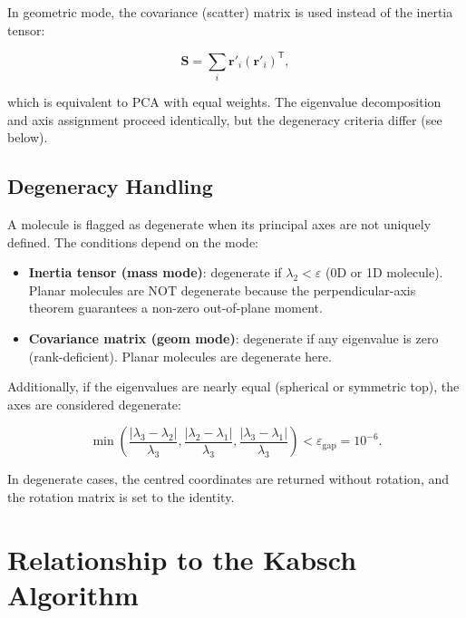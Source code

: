 \documentclass[11pt,a4paper]{article}
\newcommand{\vect}[1]{\bm{#1}}
\begin{document}
In geometric mode, the covariance (scatter) matrix is used instead of the
inertia tensor:

\begin{equation}
\vect{S} = \sum_i \vect{r}'_i (\vect{r}'_i)^{\mathsf T},
\end{equation}

which is equivalent to PCA with equal weights.  The eigenvalue
decomposition and axis assignment proceed identically, but the
degeneracy criteria differ (see below).

\subsection{Degeneracy Handling}

A molecule is flagged as degenerate when its principal axes are not
uniquely defined.  The conditions depend on the mode:

\begin{itemize}
    \item \textbf{Inertia tensor (mass mode)}: degenerate if
          $\lambda_2 < \varepsilon$ (0D or 1D molecule).  Planar
          molecules are NOT degenerate because the perpendicular-axis
          theorem guarantees a non-zero out-of-plane moment.
    \item \textbf{Covariance matrix (geom mode)}: degenerate if any
          eigenvalue is zero (rank-deficient).  Planar molecules are
          degenerate here.
\end{itemize}

Additionally, if the eigenvalues are nearly equal (spherical or symmetric
top), the axes are considered degenerate:

\begin{equation}
\min\!\left(
\frac{|\lambda_3 - \lambda_2|}{\lambda_3},
\frac{|\lambda_2 - \lambda_1|}{\lambda_3},
\frac{|\lambda_3 - \lambda_1|}{\lambda_3}
\right) < \varepsilon_{\text{gap}} = 10^{-6}.
\end{equation}

In degenerate cases, the centred coordinates are returned without
rotation, and the rotation matrix is set to the identity.

\section{Relationship to the Kabsch Algorithm}
\end{document}
